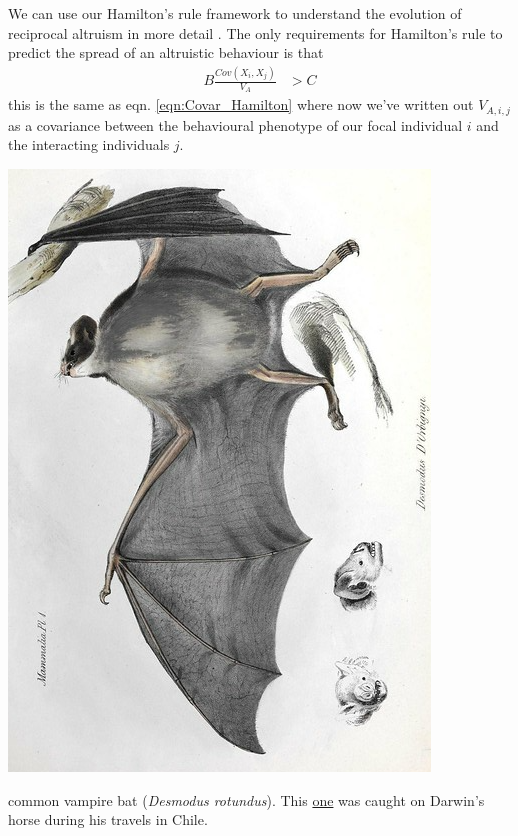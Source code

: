 We can use our Hamilton's rule framework to understand the evolution
of reciprocal altruism in more detail \citep{queller2011expanded}. The
only requirements for Hamilton's rule to predict the spread of an
altruistic behaviour is that
\begin{eqnarray}
 B \frac{Cov(X_i,X_j)}{V_A} & >  C  
\end{eqnarray}
this is the same as eqn. \eqref{eqn:Covar_Hamilton} where now we've written out
$V_{A,i,j}$ as a covariance between the behavioural phenotype of our
focal individual $i$ and the interacting individuals $j$.

\begin{marginfigure}
\begin{center}
\includegraphics[width= \textwidth]{illustration_images/Quant_gen/vampire_bat/Vampire_bat_rotated.png}
\end{center}
\caption{common vampire bat ({\it Desmodus rotundus}). This \href{https://www.biodiversitylibrary.org/page/40299740\#page/274/mode/1up}{one} was
  caught on Darwin's horse during his travels in Chile.  } \label{fig:vampire_bat}  
\end{marginfigure}

